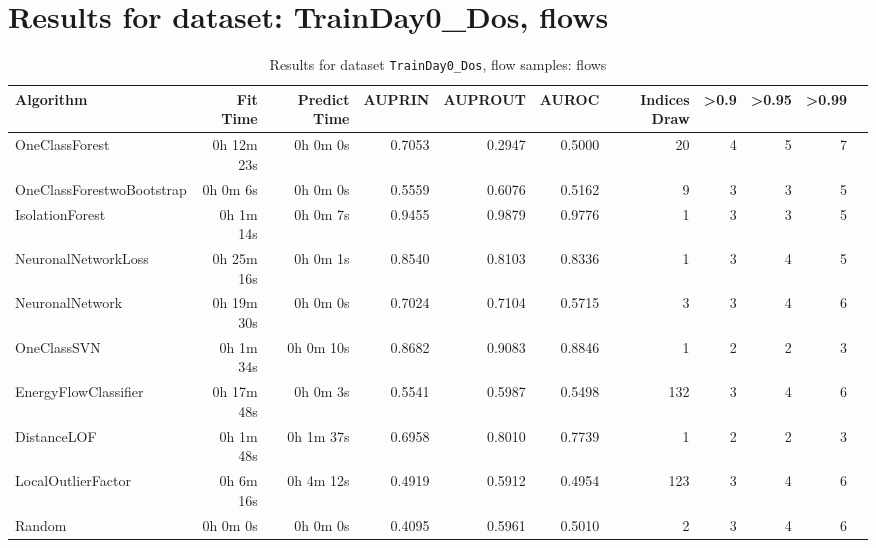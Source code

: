 \documentclass{article}
\begin{document}
\section*{Results for dataset: TrainDay0_Dos, flows}
\begin{table}[h!]
\centering
\caption{Results for dataset \texttt{TrainDay0_Dos}, flow samples: flows}
\label{tab:trainday0dos_flows}
\begin{tabular}{lrrrrrrrrrr}
\toprule
Algorithm & Fit Time & Predict Time & AUPRIN & AUPROUT & AUROC & Indices Draw & >0.9 & >0.95 & >0.99 \\
\midrule
OneClassForest & 0h 12m 23s & 0h 0m 0s & 0.7053 & 0.2947 & 0.5000 & 20 & 4 & 5 & 7 \\
OneClassForestwoBootstrap & 0h 0m 6s & 0h 0m 0s & 0.5559 & 0.6076 & 0.5162 & 9 & 3 & 3 & 5 \\
IsolationForest & 0h 1m 14s & 0h 0m 7s & 0.9455 & 0.9879 & 0.9776 & 1 & 3 & 3 & 5 \\
NeuronalNetworkLoss & 0h 25m 16s & 0h 0m 1s & 0.8540 & 0.8103 & 0.8336 & 1 & 3 & 4 & 5 \\
NeuronalNetwork & 0h 19m 30s & 0h 0m 0s & 0.7024 & 0.7104 & 0.5715 & 3 & 3 & 4 & 6 \\
OneClassSVN & 0h 1m 34s & 0h 0m 10s & 0.8682 & 0.9083 & 0.8846 & 1 & 2 & 2 & 3 \\
EnergyFlowClassifier & 0h 17m 48s & 0h 0m 3s & 0.5541 & 0.5987 & 0.5498 & 132 & 3 & 4 & 6 \\
DistanceLOF & 0h 1m 48s & 0h 1m 37s & 0.6958 & 0.8010 & 0.7739 & 1 & 2 & 2 & 3 \\
LocalOutlierFactor & 0h 6m 16s & 0h 4m 12s & 0.4919 & 0.5912 & 0.4954 & 123 & 3 & 4 & 6 \\
Random & 0h 0m 0s & 0h 0m 0s & 0.4095 & 0.5961 & 0.5010 & 2 & 3 & 4 & 6 \\
\bottomrule
\end{tabular}
\end{table}
\end{document}
